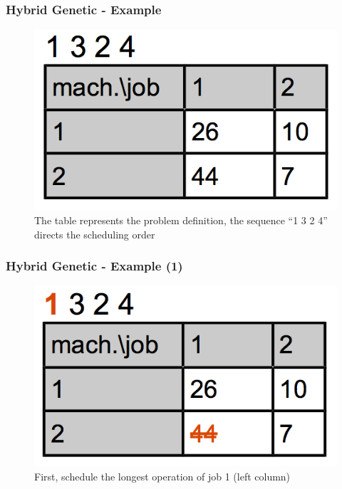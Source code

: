 \begin{frame}
  \frametitle{Hybrid Genetic - Example}

\begin{figure}[htbp]
	\centering
		\includegraphics[scale=1]{images/hyb0.png}
	\caption{The table represents the problem definition, the sequence ``1 3 2 4'' directs the scheduling order}
	\label{fig:label}
\end{figure}
	
 
\end{frame}
\begin{frame}
  \frametitle{Hybrid Genetic - Example (1)}

\begin{figure}[htbp]
	\centering
		\includegraphics[scale=1]{images/hyb1.png}
	\caption{First, schedule the longest operation of job 1 (left column)}
	\label{fig:label}
\end{figure}
	
 
\end{frame}
